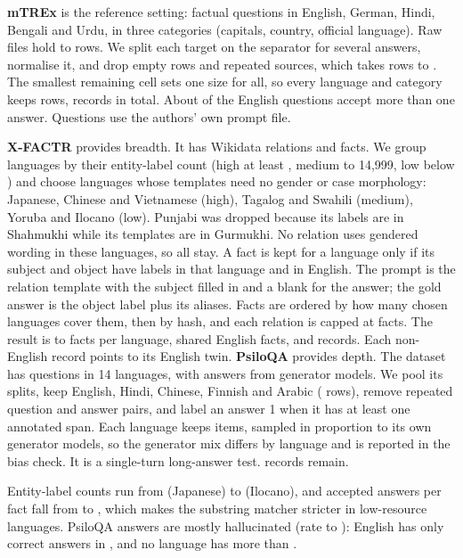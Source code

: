\documentclass[12pt]{article}
\begin{document}
\textbf{mTREx} is the reference setting: factual questions in English, German, Hindi, Bengali and Urdu, in three categories (capitals, country, official language). Raw files hold \mtrexrawmin{} to \mtrexrawmax{} rows. We split each target on the separator for several answers, normalise it, and drop empty rows and repeated sources, which takes \mtrexraw{} rows to \mtrexuniq{}. The smallest remaining cell sets one size for all, so every language and category keeps \mtrexcell{} rows, \nmtrex{} records in total. About \mtrexmulti{} of the English questions accept more than one answer. Questions use the authors' own prompt file.

\textbf{X-FACTR} provides breadth. It has \xfactrrelations{} Wikidata relations and \xfactrfacts{} facts. We group languages by their entity-label count (high at least \highmin{}, medium \medmin{} to 14,999, low below \medmin{}) and choose languages whose templates need no gender or case morphology: Japanese, Chinese and Vietnamese (high), Tagalog and Swahili (medium), Yoruba and Ilocano (low). Punjabi was dropped because its labels are in Shahmukhi while its templates are in Gurmukhi. No relation uses gendered wording in these languages, so all \xfactrrelations{} stay. A fact is kept for a language only if its subject and object have labels in that language and in English. The prompt is the relation template with the subject filled in and a blank for the answer; the gold answer is the object label plus its aliases. Facts are ordered by how many chosen languages cover them, then by hash, and each relation is capped at \xfactrcap{} facts. The result is \sampledmin{} to \sampledmax{} facts per language, \xfactrenfacts{} shared English facts, and \nxfactr{} records. Each non-English record points to its English twin.
\textbf{PsiloQA} provides depth. The dataset has \psiloqatotal{} questions in 14 languages, with answers from \psiloqamodels{} generator models. We pool its splits, keep English, Hindi, Chinese, Finnish and Arabic (\psiloqapooled{} rows), remove \psiloqadups{} repeated question and answer pairs, and label an answer 1 when it has at least one annotated span. Each language keeps \psiloqaperlang{} items, sampled in proportion to its own generator models, so the generator mix differs by language and is reported in the bias check. It is a single-turn long-answer test. \npsiloqa{} records remain.

Entity-label counts run from  (Japanese) to  (Ilocano), and accepted answers per fact fall from \aliasmax{} to \aliasmin{}, which makes the substring matcher stricter in low-resource languages. PsiloQA answers are mostly hallucinated (rate \psiloqaratemin{} to \psiloqaratemax{}): English has only \psiloqaencorrect{} correct answers in \psiloqaperlang{}, and no language has more than \psiloqacorrectmax{}.
\end{document}
